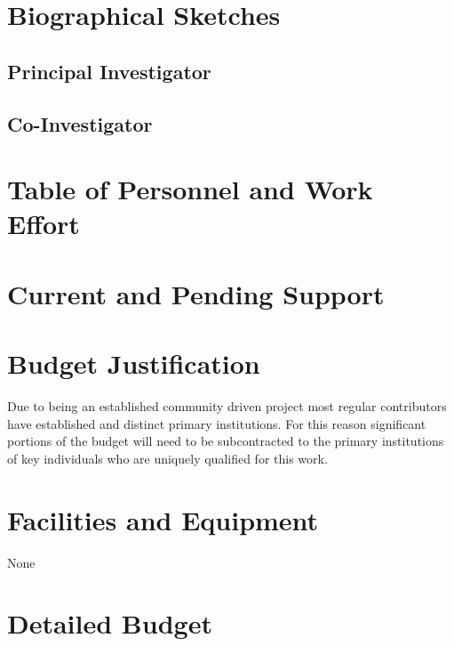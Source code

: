 \documentclass[12pt]{article}
\numberwithin{page}{section}
\begin{document}
\newpage
\section{Biographical Sketches}
\setcounter{page}{1}
\newpage
\subsection{Principal Investigator}
\newpage
\subsection{Co-Investigator}

\newpage
\section{Table of Personnel and Work Effort}
\setcounter{page}{1}

\newpage
\section{Current and Pending Support}
\setcounter{page}{1}

\newpage
\section{Budget Justification}
\setcounter{page}{1}

Due to being an established community driven project most regular
contributors have established and distinct primary institutions.  For
this reason significant portions of the budget will need to be
subcontracted to the primary institutions of key individuals who are
uniquely qualified for this work.

\newpage
\section{Facilities and Equipment}
\setcounter{page}{1}

None

\newpage
\section{Detailed Budget}
\setcounter{page}{1}
\end{document}
